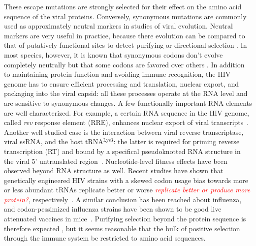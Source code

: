 \documentclass[rmp, twocolumn]{revtex4}
\newcommand{\comment}[1]{\textit{\textcolor{red}{#1}}}
\newcommand{\rev}{\textit{rev}}
\begin{document}
These escape mutations are strongly selected for their effect on the amino acid
sequence of the viral proteins. Conversely, synonymous mutations are commonly
used as approximately neutral markers in studies of viral evolution. Neutral
markers are very useful in practice, because there evolution can be compared to
that of putatively functional sites to detect purifying or directional selection
\citep{Bhatt:2011p43255,Hurst:2002p32608,Chen:2004p22606}. In most species,
however, it is  known that synonymous codons don't evolve completely neutrally
but that some codons are favored over others \citep{plotkin_synonymous_2011}.
In addition to maintaining protein function and avoiding immune
recognition, the HIV genome has to ensure efficient processing and translation,
nuclear export, and packaging into the viral capsid: all these processes operate at the RNA
level and are sensitive to synonymous changes. A few functionally important RNA
elements are well characterized. For example, a certain RNA sequence in the HIV
genome, called \rev{} response element (RRE), enhances nuclear export of viral
transcripts~\citep{fernandes_hiv-1_2012}. Another well studied case is the
interaction between viral reverse transcriptase, viral ssRNA, and the host
tRNA$^\text{Lys3}$: the latter is required for priming reverse transcription
(RT) and bound by a specifical pseudoknotted RNA structure in the viral 5'
untranslated region~\citep{barat_interaction_1991, paillart_vitro_2002}.
Nucleotide-level fitness effects have been observed beyond RNA structure as
well. Recent studies have shown that genetically engineered HIV strains with
a skewed codon usage bias towards more or less abundant tRNAs
replicate better or worse \comment{replicate better or produce more protein?},
respectively~\citep{ngumbela_quantitative_2008, li_codon-usage-based_2012}. A similar conclusion has been reached about
influenza, and codon-pessimized influenza strains have been shown to be good
live attenuated vaccines in mice~\citep{mueller_live_2010}. Purifying selection
beyond the protein sequence is therefore expected
\citep{forsdyke_reciprocal_1995,snoeck_mapping_2011}, but it seems reasonable
that the bulk of positive selection through the immune system be restricted to amino acid sequences.

\end{document}
